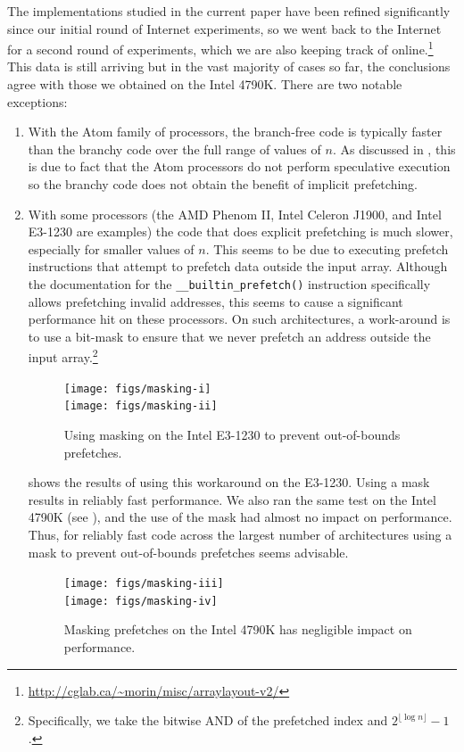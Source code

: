 \documentclass{patmorin}
\begin{document}
The implementations studied in the current paper have been
refined significantly since our initial round of Internet
experiments, so we went back to the Internet for a second
round of experiments, which we are also keeping track of
online.\footnote{\url{http://cglab.ca/~morin/misc/arraylayout-v2/}}
This data is still arriving but in the vast majority of cases so far,
the conclusions agree with those we obtained on the Intel 4790K.  There are two notable exceptions:
\begin{enumerate}
\item With the Atom family of processors, the branch-free code is
typically faster than the branchy code over the full range of values
of $n$.  As discussed in , this is due to
fact that the Atom processors do not perform speculative execution so
the branchy code does not obtain the benefit of implicit prefetching.

\item With some processors (the AMD Phenom II, Intel Celeron J1900,
and Intel E3-1230 are examples) the code that does explicit prefetching
is much slower, especially for smaller values of $n$.  This seems to
be due to executing prefetch instructions that attempt to prefetch
data outside the input array.  Although the documentation for the
\texttt{__builtin_prefetch()} instruction specifically
allows prefetching invalid addresses, this seems to cause a significant
performance hit on these processors.  On such architectures, a work-around
is to use a bit-mask to ensure that we never prefetch an address outside
the input array.\footnote{Specifically, we take the bitwise AND of the
prefetched index and $2^{\lfloor\log n\rfloor}-1$.}

\begin{figure}
    \begin{center}
      \texttt{[image: figs/masking-i]}\\[1em]
      \texttt{[image: figs/masking-ii]}
   \end{center}
   \caption{Using masking on the Intel E3-1230 to prevent out-of-bounds prefetches.}
\end{figure}

 shows the results of using this workaround on the
E3-1230. Using a mask results in reliably fast performance.  We also ran
the same test on the Intel 4790K (see ), and the use
of the mask had almost no impact on performance.  Thus, for reliably
fast code across the largest number of architectures using a mask to
prevent out-of-bounds prefetches seems advisable.
\begin{figure}
    \begin{center}
      \texttt{[image: figs/masking-iii]}\\[1em]
      \texttt{[image: figs/masking-iv]}
   \end{center}
   \caption{Masking prefetches on the Intel 4790K has negligible impact on performance.}
\end{figure}

\end{enumerate}
\end{document}
